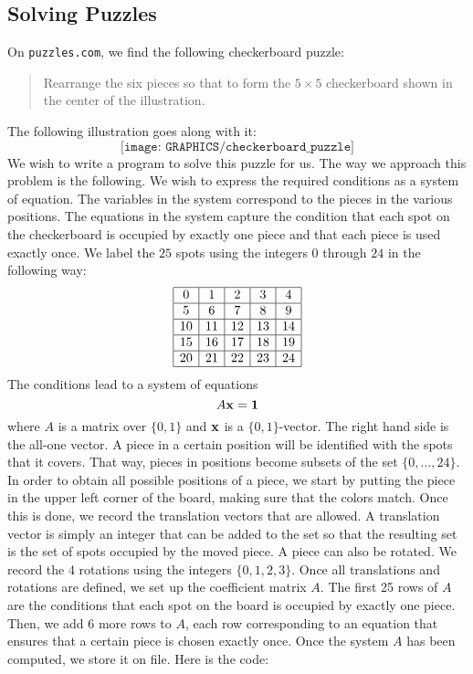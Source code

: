 \subsection{Solving Puzzles}


On \verb'puzzles.com', we find the following checkerboard puzzle:
\begin{quote}
Rearrange the six pieces so that to form the $5\times 5$ 
checkerboard shown in the center of the illustration.
\end{quote}
The following illustration goes along with it:
$$
\texttt{[image: GRAPHICS/checkerboard\_puzzle]}
$$
We wish to write a program to solve this puzzle for us. 
The way we approach this problem is the following. 
We wish to express the required conditions  
as a system of equation. The variables in the system correspond to the pieces in the various positions. 
The equations in the system capture the condition that each spot on the checkerboard 
is occupied by exactly one piece 
and that each piece is used exactly once. 
We label the $25$ spots using the integers $0$ through $24$ in the following way:
$$
\begin{array}{|c|c|c|c|c|}
\hline
0 & 1 & 2 & 3 & 4 \\
\hline
5 & 6 & 7 & 8 & 9 \\
\hline
10 & 11 & 12 & 13 & 14 \\
\hline
15 & 16 & 17 & 18 & 19 \\
\hline
20 & 21 & 22 & 23 & 24 \\
\hline
\end{array}
$$
The conditions lead to a system of equations 
$$
A {\bf x} = {\bf 1}
$$
where $A$ is a matrix over $\{0,1\}$ and ${\bf x}$ is a $\{0,1\}$-vector. 
The right hand side is the all-one vector.
A piece in a certain position will be identified with the spots that it covers. 
That way, pieces in positions become subsets of the set $\{0,\ldots,24\}.$
In order to obtain all possible positions of a piece, we start by putting the piece in the upper left corner 
of the board, making sure that the colors match. Once this is done, we record the translation vectors 
that are allowed. 
A translation vector is simply an integer that can be added to the set so that the 
resulting set is the set of spots occupied by the moved piece. 
A piece can also be rotated. 
We record the 
4 rotations using the integers $\{0,1,2,3\}.$ 
Once all translations and rotations are defined, we set up the coefficient matrix $A$. 
The first 25 rows of $A$ are the conditions that each spot on the board is occupied by exactly one piece.  
Then, we add 6 more rows to $A$, each row corresponding to an equation that ensures that a certain piece 
is chosen exactly once.
Once the system $A$ has been computed, we store it on file. 
Here is the code:


